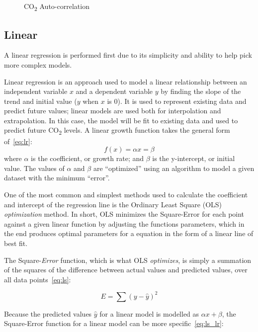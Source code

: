 \documentclass{mcmthesis}
\begin{document}
\begin{figure}[h]
\begin{minipage}{.5\textwidth}
            \caption{CO\textsubscript{2} Auto-correlation}
            \label{fig:co2_acf}
        \end{minipage}
    \end{figure}

    \subsection{Linear}
    A linear regression is performed first due to its simplicity and ability to help pick more complex models.

    Linear regression is an approach used to model a linear relationship between an independent variable $x$ and a dependent variable $y$ by finding the slope of the trend and initial value ($y$ when $x$ is 0).
    It is used to represent existing data and predict future values; linear models are used both for interpolation and extrapolation. In this case, the model will be fit to existing data and used to predict future CO\textsubscript{2} levels.
    A linear growth function takes the general form of~\eqref{eq:lr}:
%
    \begin{equation}
        f(x) = \alpha x = \beta
        \label{eq:lr}
    \end{equation}
%
    \noindent where $\alpha$ is the coefficient, or growth rate; and $\beta$ is the y-intercept, or initial value.
    The values of $\alpha$ and $\beta$ are ``optimized'' using an algorithm to model a given dataset with the minimum ``error''.

    One of the most common and simplest methods used to calculate the coefficient and intercept of the regression line is the Ordinary Least Square (OLS) \textit{optimization} method.
    In short, OLS minimizes the Square-Error for each point against a given linear function by adjusting the function\textquotesingle s parameters, which in the end produces optimal parameters for a equation in the form of a linear line of best fit.

    The Square-\textit{Error} function, which is what OLS \textit{optimizes}, is simply a summation of the squares of the difference between actual values and predicted values, over all data points~\eqref{eq:ls}:

    \begin{equation}
        E = \sum{(y - \hat{y})^2}
        \label{eq:ls}
    \end{equation}

    Because the predicted values $\hat{y}$ for a linear model is modelled as $\alpha x + \beta$, the Square-Error function for a linear model can be more specific~\eqref{eq:ls_lr}:
\end{document}
